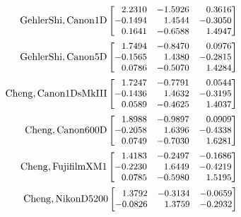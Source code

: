 \begin{align}
\small{\mathrm{GehlerShi, Canon1D}}
\begin{bmatrix}
\phantom{-}2.2310 & -1.5926 & \phantom{-}0.3616 \\
-0.1494 & \phantom{-}1.4544 & -0.3050 \\
\phantom{-}0.1641 & -0.6588 & \phantom{-}1.4947 \\
\end{bmatrix} \nonumber
 \\
\small{\mathrm{GehlerShi, Canon5D}}
\begin{bmatrix}
\phantom{-}1.7494 & -0.8470 & \phantom{-}0.0976 \\
-0.1565 & \phantom{-}1.4380 & -0.2815 \\
\phantom{-}0.0786 & -0.5070 & \phantom{-}1.4284 \\
\end{bmatrix} \nonumber
\\
\small{\mathrm{Cheng, Canon1DsMkIII}}
\begin{bmatrix}
\phantom{-}1.7247 & -0.7791 & \phantom{-}0.0544 \\
-0.1436 & \phantom{-}1.4632 & -0.3195 \\
\phantom{-}0.0589 & -0.4625 & \phantom{-}1.4037 \\
\end{bmatrix} \nonumber
 \\
\small{\mathrm{Cheng, Canon600D}}
\begin{bmatrix}
\phantom{-}1.8988 & -0.9897 & \phantom{-}0.0909 \\
-0.2058 & \phantom{-}1.6396 & -0.4338 \\
\phantom{-}0.0749 & -0.7030 & \phantom{-}1.6281 \\
\end{bmatrix} \nonumber
 \\
\small{\mathrm{Cheng, FujifilmXM1}}
\begin{bmatrix}
\phantom{-}1.4183 & -0.2497 & -0.1686 \\
-0.2230 & \phantom{-}1.6449 & -0.4219 \\
\phantom{-}0.0785 & -0.5980 & \phantom{-}1.5195 \\
\end{bmatrix} \nonumber
 \\
\small{\mathrm{Cheng, NikonD5200}}
\begin{bmatrix}
\phantom{-}1.3792 & -0.3134 & -0.0659 \\
-0.0826 & \phantom{-}1.3759 & -0.2932 \\

\end{bmatrix}
\end{align}
